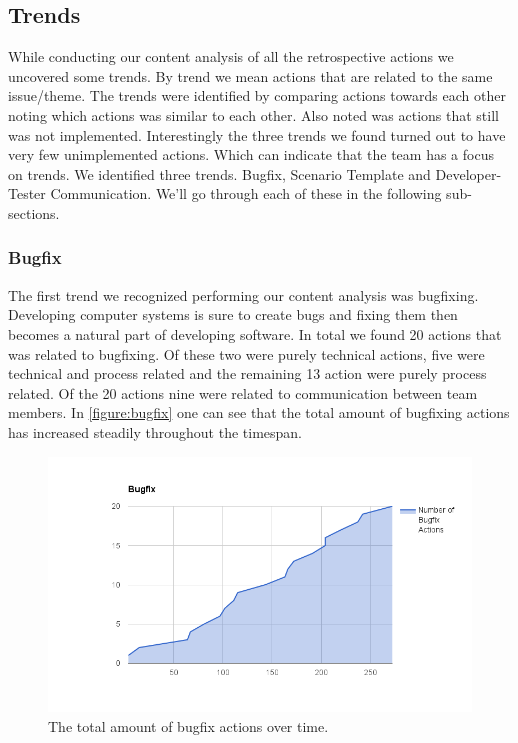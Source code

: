 \subsection{Trends}
While conducting our content analysis of all the retrospective actions we uncovered some trends. By trend we mean actions that are related to the same issue/theme. The trends were identified by comparing actions towards each other noting which actions was similar to each other. Also noted was actions that still was not implemented. Interestingly the three trends we found turned out to have very few unimplemented actions. Which can indicate that the team has a focus on trends. We identified three trends. Bugfix, Scenario Template and Developer-Tester Communication. We'll go through each of these in the following sub-sections. 

\subsubsection{Bugfix}
\label{section:bugfix}
The first trend we recognized performing our content analysis was bugfixing. Developing computer systems is sure to create bugs and fixing them then becomes a natural part of developing software. In total we found 20 actions that was related to bugfixing. Of these two were purely technical actions, five were technical and process related and the remaining 13 action were purely process related. Of the 20 actions nine were related to communication between team members. In \autoref{figure:bugfix} one can see that the total amount of bugfixing actions has increased steadily throughout the timespan. 

\begin{figure}[!h]
	\centering
	\includegraphics[width=\textwidth, keepaspectratio]{figures/bugfix.png}
	\caption{The total amount of bugfix actions over time.}
	\label{figure:bugfix}
\end{figure}

